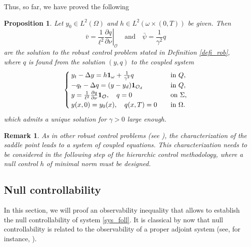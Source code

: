 \documentclass[preprint,10pt]{article}
\newtheorem{proposition}[theorem]{Proposition}
\newtheorem{remark}[theorem]{Remark}
\numberwithin{equation}{section}
\numberwithin{theorem}{section}
\begin{document}
{Thus, so far, we have proved the following
%
\begin{proposition}
Let $y_0\in L^2(\Omega)$ and $h\in L^2(\omega\times(0,T))$ be given. Then
%
\begin{equation}
\bar v=\left.\frac{1}{\ell^2}\frac{\partial q}{\partial \nu}\right|_{\mathcal O} \quad\text{and}\quad \bar \psi=\frac{1}{\gamma^2}q
\end{equation}
% 
are the solution to the robust control problem stated in Definition \ref{defi_rob}, where $q$ is found from the solution $(y,q)$ to the coupled system 
%
\begin{equation}\label{sys_foll}
\begin{cases}
y_t-\Delta y= h\mathbf{1}_\omega+\frac{1}{\gamma^2}q \quad&\textnormal{in }Q, \\
-q_t-\Delta q=(y-y_d)\mathbf{1}_{\mathcal O_d} \quad& \textnormal{in }Q, \\
y=\frac{1}{\ell^2}\frac{\partial q}{\partial \nu}\mathbf {1}_\mathcal O, \quad q=0 \quad &\textnormal{on $\Sigma$,} \\
y(x,0)=y_0(x), \quad q(x,T)=0 \quad &\textnormal{in $\Omega$}.
\end{cases}
\end{equation}
%
which admits a unique solution for $\gamma>0$ large enough. 
%
\end{proposition}
%
\begin{remark}
As in other robust control problems (see \cite{temam_nonlinear,aziz,vhs_deT_rob}), the characterization of the saddle point leads to a system of coupled equations. This characterization needs to be considered in the following step of the hierarchic control methodology, where a null control $h$ of minimal norm must be designed.
\end{remark}
%
%
\subsection{Null controllability}
%
In this section, we will proof an observability inequality that allows to establish the null controllability of system \eqref{sys_foll}. It is classical by now that null controllability is related to the observability of a proper adjoint system (see, for instance, \cite{cara_guerrero,zab}). 

}
\end{document}
